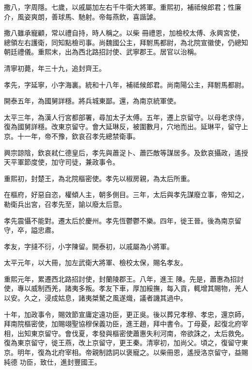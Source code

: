 \begin{pinyinscope}
 撒八，字周隱。七歲，以戚屬加左右千牛衛大將軍。重熙初，補祗候郎君；性廉介，風姿爽朗，善球馬、馳射。帝每燕飲，喜諧謔。



 撒八雖承寵顧，常以禮自持，時人稱之。以柴
 冊禮恩，加檢校太傅、永興宮使，總領左右護衛，同知點檢司事。尚魏國公主，拜駙馬都尉，為北院宣徽使，仍總知朝廷禮儀。重熙末，出為西北路招討使、武寧郡王。居官以治稱。



 清寧初薨，年三十九，追封齊王。



 孝先，字延寧，小字海裏。統和十八年，補祗候郎君。尚南陽公主，拜駙馬都尉。



 開泰五年，為國舅詳穩。將兵城東鄙。還，為南京統軍使。



 太平三年，為漢人行宮都部署，尋加太子太傅。五年，遷上京留守。以母老求侍，復為國舅詳穩。改東京留守。會大延琳反，被圍數月，穴地而出。延琳平，留守上京。十一年，帝不豫，欽哀召孝先總禁衛事。



 興宗諒陰，欽哀弒仁德皇后，孝先與蕭浞卜、蕭匹敵等謀居多。及欽哀攝政，遙授天平軍節度使，加守司徒，兼政事令。



 重熙初，封楚王，為北院樞密使。孝先以椒房親，為太后所重。



 在樞府，好惡自恣，權傾人主，朝多側目。三年，太后與孝先謀廢立事，帝知之，勒衛兵出宮，召孝先至，諭以廢太后意。



 孝先震懾不能對。遷太后於慶州。孝先恆鬱鬱不樂。四年，徙王晉。後為南京留守，卒，謚忠肅。



 孝友，字撻不衍，小字陳留。開泰初，以戚屬為小將軍。



 太平元年，以大冊，加左武衛大將軍、檢校太保，賜名孝友。



 重熙元年，累遷西北路招討使，封蘭陵郡王。八年，進王
 陳。先是，蕭惠為招討使，專以威制西羌，諸夷多叛。孝友下車，厚加綏撫，每入貢，輒增其賜物，羌人以安。久之，浸成姑息，諸夷桀驁之風遂熾，議者譏其過中。



 十年，加政事令，賜效節宣庸定遠功臣，更正吳。後以葬兄孝穆、孝忠，還京師，拜南院樞密使，加賜翊聖協穆保義功臣，進王趙，拜中書令。丁母憂，起復北府宰相，出知東京留守。會伐夏，孝發與樞密使蕭惠失利河南，帝欲誅之，太后救免。復為東京留守，徙王燕，改上京留守，更王秦。清寧初，加尚父。頃之，復留守東京。明年，復為北府宰相。帝親制誥詞以褒寵之。以柴冊恩，遙授洛京留守，益賜純德
 功臣，致仕，進封豐國王。




\end{pinyinscope}

